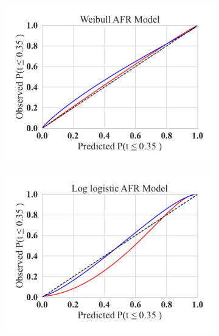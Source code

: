 \documentclass[journal]{IEEEtran}
\begin{document}
\begin{figure}[h!]
    \centering
    \captionsetup[subfigure]{skip=0pt} %
    \begin{subfigure}[b]{.3\linewidth}
        \centering
        \includegraphics[width=\linewidth,clip]{plots/combined/weibull_qq.pdf}
        \caption{}
    \end{subfigure}
    \begin{subfigure}[b]{.3\linewidth}
        \centering
        \includegraphics[width=\linewidth,clip]{plots/combined/log_logistic_qq.pdf}
        \caption{ }
    \end{subfigure}
    \begin{subfigure}[b]{.3\linewidth}
        \centering

\end{subfigure}
\end{figure}
\end{document}
